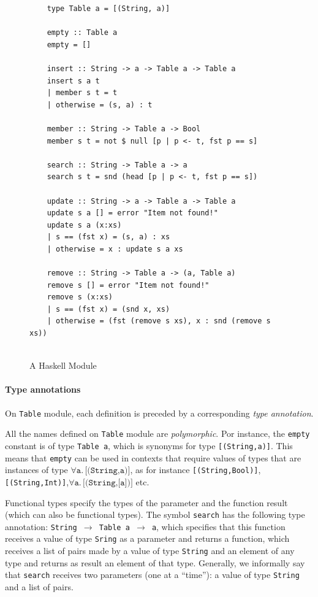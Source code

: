 \documentclass[oneside,12pt]{scrbook}
\theoremstyle{definition}
\theoremstyle{plain}
\theoremstyle{definition}
\begin{document}
\begin{figure}
	\begin{verbatim}
	type Table a = [(String, a)]
	
	empty :: Table a
	empty = []
	
	insert :: String -> a -> Table a -> Table a
	insert s a t
	| member s t = t
	| otherwise = (s, a) : t
	
	member :: String -> Table a -> Bool
	member s t = not $ null [p | p <- t, fst p == s]
	
	search :: String -> Table a -> a
	search s t = snd (head [p | p <- t, fst p == s])
	
	update :: String -> a -> Table a -> Table a
	update s a [] = error "Item not found!"
	update s a (x:xs)
	| s == (fst x) = (s, a) : xs
	| otherwise = x : update s a xs
	
	remove :: String -> Table a -> (a, Table a)
	remove s [] = error "Item not found!"
	remove s (x:xs)
	| s == (fst x) = (snd x, xs)
	| otherwise = (fst (remove s xs), x : snd (remove s xs))
	
	\end{verbatim}
	\caption{A Haskell Module}
	\label{fig:haskell}
\end{figure}

\paragraph{Type annotations}

On \texttt{Table} module, each definition is preceded by a corresponding \emph{type annotation}.

All the names defined on \texttt{Table} module are \emph{polymorphic}. Por instance, the \texttt{empty} constant is of type \texttt{Table a}, which is synonyms for type \texttt{[(String,a)]}. This means that \texttt{empty} can be used in contexts that require values of types that are instances of type $\forall\texttt{a.$\,$[(String,a)]}$, as for instance \texttt{[(String,Bool)]}, \texttt{[(String,Int)]},\linebreak$\forall\texttt{a.$\,$[(String,[a])]}$ etc.

Functional types specify the types of the parameter and the function result (which can also be functional types). The symbol \texttt{search} has the following type annotation: \texttt{String $\rightarrow$ Table a $\rightarrow$ a}, which specifies that this function receives a value of type \texttt{Sring} as a parameter and returns a function, which receives a list of pairs made by a value of type \texttt{String} and an element of any type and returns as result an element of that type. Generally, we informally say that \texttt{search} receives two parameters (one at a ``time''): a value of type \texttt{String} and a list of pairs.
\end{document}

